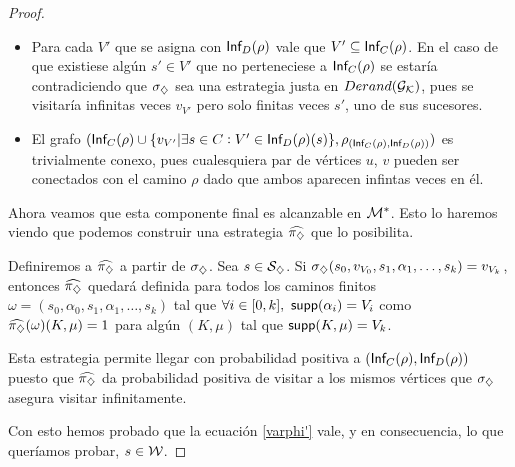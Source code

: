 \begin{proof}
	\begin{itemize}
		\item Para cada $V'$ que se asigna con $\textsf{Inf}_D(\rho)$ vale que $V' \subseteq
			      \textsf{Inf}_C(\rho)$. En el caso de que existiese algún $s' \in V'$ que no
		      perteneciese a $\textsf{Inf}_C(\rho)$ se estaría contradiciendo que $\sigma_\diamondsuit$ sea
		      una estrategia justa en $Derand(\mathcal{G}_{\mathcal{K}})$, pues se visitaría infinitas veces $v_{V'}$ pero
		      solo finitas veces $s'$, uno de sus sucesores.
		\item El grafo $(\textsf{Inf}_C(\rho) \cup \{v_{V'} | \exists s \in C : V' \in
			      \textsf{Inf}_D(\rho)(s)\}, \rho_{(\textsf{Inf}_C(\rho), \textsf{Inf}_D(\rho))})$ es trivialmente
		      conexo, pues cualesquiera par de vértices $u$, $v$ pueden ser conectados con el
		      camino $\rho$ dado que ambos aparecen infintas veces en él.
	\end{itemize}

	Ahora veamos que esta componente final es alcanzable en $\mathcal{M}^*$. Esto lo haremos
	viendo que podemos construir una estrategia $\widehat {\pi_\diamondsuit}$ que lo
	posibilita.

	Definiremos a $\widehat {\pi_\diamondsuit}$ a partir de $\sigma_\diamondsuit$. Sea $s \in
		\mathcal{S}_\diamondsuit$. Si $\sigma_\diamondsuit(s_0, v_{V_0}, s_1, \alpha_1, \dots, s_k) =
		v_{V_k}$, entonces $\widehat {\pi_\diamondsuit}$ quedará definida para todos los caminos
	finitos $\omega = (s_0, \alpha_0, s_1, \alpha_1, \dots, s_k)$ tal que $\forall
		i \in [0, k], \ \textsf{supp}(\alpha_i) = V_i$ como $\widehat {\pi_\diamondsuit} (\omega)(K, \mu)
		= 1$ para algún $(K, \mu)$ tal que $\textsf{supp}(K, \mu) = V_k$.


	Esta estrategia permite llegar con probabilidad positiva a $(\textsf{Inf}_C(\rho),
		\textsf{Inf}_D(\rho))$ puesto que $\widehat {\pi_\diamondsuit}$ da probabilidad positiva de
	visitar a los mismos vértices que $\sigma_\diamondsuit$ asegura visitar infinitamente.

	Con esto hemos probado que la ecuación \ref{varphi'} vale, y en consecuencia,
	lo que queríamos probar, $s \in \mathcal{W}$.



\end{proof}
